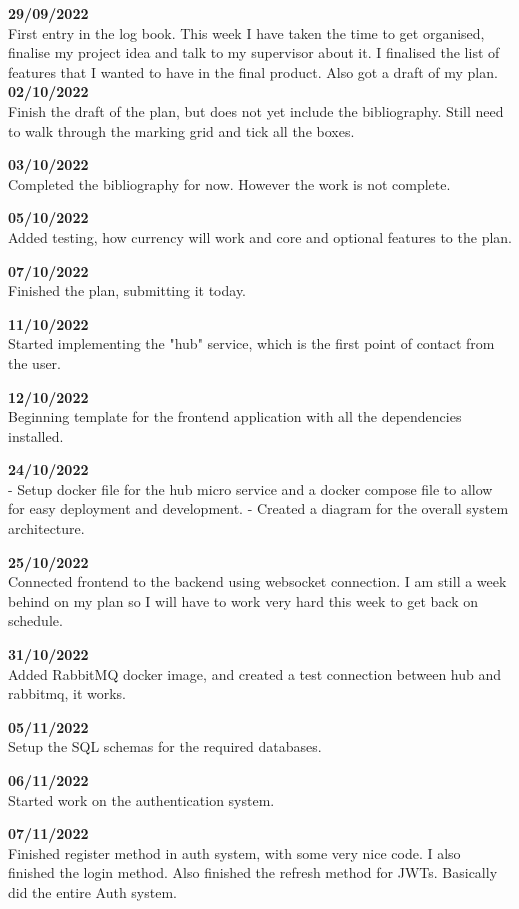\documentclass[titlepage]{article}
\begin{document}
\textbf{29/09/2022} \\
First entry in the log book. This week I have taken the time to get organised, finalise my project idea and talk to my supervisor about it. I finalised the list of features that I wanted to have in the final product. Also got a draft of my plan.
\\

\noindent
\textbf{02/10/2022} \\
Finish the draft of the plan, but does not yet include the bibliography. Still need to walk through the marking grid and tick all the boxes.

\textbf{03/10/2022} \\
Completed the bibliography for now. However the work is not complete.

\textbf{05/10/2022} \\
Added testing, how currency will work and core and optional features to the plan.

\textbf{07/10/2022} \\
Finished the plan, submitting it today.

\textbf{11/10/2022} \\
Started implementing the "hub" service, which is the first point of contact from the user.

\textbf{12/10/2022} \\
Beginning template for the frontend application with all the dependencies installed.

\textbf{24/10/2022} \\
- Setup docker file for the hub micro service and a docker compose file to allow for easy deployment and development.
- Created a diagram for the overall system architecture.

\textbf{25/10/2022} \\
Connected frontend to the backend using websocket connection. I am still a week behind on my plan so I will have to work very hard this week to get back on schedule.

\textbf{31/10/2022} \\
Added RabbitMQ docker image, and created a test connection between hub and rabbitmq, it works.

\textbf{05/11/2022} \\
Setup the SQL schemas for the required databases.

\textbf{06/11/2022} \\
Started work on the authentication system.

\textbf{07/11/2022} \\
Finished register method in auth system, with some very nice code.
I also finished the login method.
Also finished the refresh method for JWTs. Basically did the entire Auth system.
\end{document}
